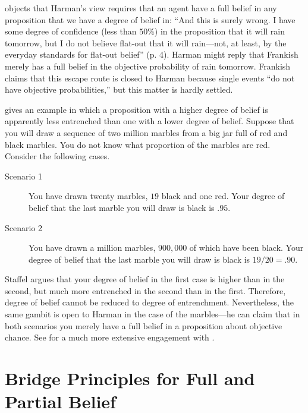 \citet{frankish2009partial} objects that Harman's view requires that an agent
have a full belief in any proposition that we have a degree of belief in: ``And
this is surely wrong. I have some degree of confidence (less than $50\%$) in the
proposition that it will rain tomorrow, but I do not believe flat-out that it
will rain---not, at least, by the everyday standards for flat-out belief'' (p.
4). Harman might reply that Frankish merely has a full belief in the objective
probability of rain tomorrow. Frankish claims that this escape route is closed
to Harman because single events ``do not have objective probabilities,'' but
this matter is hardly settled.

\citet{staffel2013can} gives an example in which a proposition with a higher
degree of belief is apparently less entrenched than one with a lower degree of
belief. Suppose that you will draw a sequence of two million marbles from a big
jar full of red and black marbles. You do not know what proportion of the
marbles are red. Consider the following cases.
\begin{description}
\item[Scenario 1] You have drawn twenty marbles, $19$ black and one red. Your
degree of belief that the last marble you will draw is black is $.95$. 
\item[Scenario 2] You have drawn a million marbles, $900,000$ of which have
been black. Your degree of belief that the last marble you will draw is black is
$19/20=.90$. 
\end{description}
Staffel argues that your degree of belief in the first case is higher than in
the second, but much more entrenched in the second than in the first. Therefore,
degree of belief cannot be reduced to degree of entrenchment. Nevertheless, the
same gambit is open to Harman in the case of the marbles---he can claim that in
both scenarios you merely have a full belief in a proposition about objective
chance. See \citet{staffel2013can} for a much more extensive engagement with
\citet{harman1986change}. 



\section{Bridge Principles for Full and Partial Belief}\label{genin-sec-6}

